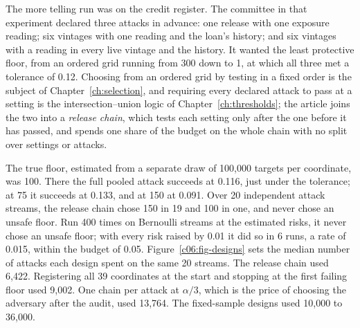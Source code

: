 The more telling run was on the credit register. The committee in that experiment
declared three attacks in advance: one release with one exposure reading; six
vintages with one reading and the loan's history; and six vintages with a reading
in every live vintage and the history. It wanted the least protective floor, from
an ordered grid running from 300 down to 1, at which all three met a tolerance of
0.12. Choosing from an ordered grid by testing in a fixed order is the subject of
Chapter~\ref{ch:selection}, and requiring every declared attack to pass at a setting
is the intersection--union logic of Chapter~\ref{ch:thresholds}; the article joins
the two into a \emph{release chain}, which tests each setting only after the one
before it has passed, and spends one share of the budget on the whole chain with no
split over settings or attacks.

The true floor, estimated from a separate draw of 100,000 targets per coordinate,
was 100. There the full pooled attack succeeds at 0.116, just under the tolerance;
at 75 it succeeds at 0.133, and at 150 at 0.091.
Over 20 independent attack streams, the release chain chose 150 in 19 and 100 in
one, and never chose an unsafe floor. Run 400 times on Bernoulli streams at the
estimated risks, it never chose an unsafe floor; with every risk raised by 0.01 it
did so in 6 runs, a rate of 0.015, within the budget of 0.05.
Figure~\ref{c06:fig-designs} sets the median number of attacks each design spent
on the same 20 streams. The release chain used 6,422. Registering all 39
coordinates at the start and stopping at the first failing floor used 9,002. One
chain per attack at $\alpha/3$, which is the price of choosing the adversary after
the audit, used 13,764. The fixed-sample designs used 10,000 to 36,000.

